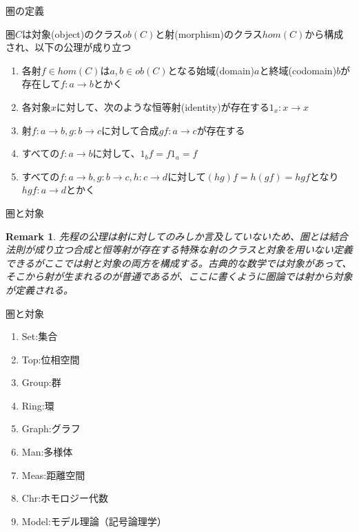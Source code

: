 \documentclass[unicode,12pt,aspectratio=169]{beamer}
\newtheorem*{remark}{Remark}
\begin{document}
\begin{frame}{圏の定義}
    \begin{tcolorbox}
        \begin{definition}
            圏$C$は対象(object)のクラス$ob(C)$と射(morphism)のクラス$hom(C)$から構成され、以下の公理が成り立つ
            \begin{enumerate}
                \item 各射$f\in hom(C)$は$a,b\in ob(C)$となる始域(domain)$a$と終域(codomain)$b$が存在して$f:a \rightarrow b$とかく
                \item 各対象$x$に対して、次のような恒等射(identity)が存在する$1_x:x \rightarrow x$
                \item 射$f: a \rightarrow b,g: b \rightarrow c$に対して合成$gf: a \rightarrow c$が存在する
                \item すべての$f:a \rightarrow b$に対して、$1_bf = f1_a = f$
                \item すべての$f:a \rightarrow b,g:b \rightarrow c,h:c \rightarrow d$に対して$(hg)f = h(gf) = hgf$となり$hgf: a\rightarrow d$とかく
            \end{enumerate}
        \end{definition}
    \end{tcolorbox}
\end{frame}
\begin{frame}{圏と対象}
    \begin{tcolorbox}
        \begin{remark}
            先程の公理は射に対してのみしか言及していないため、圏とは結合法則が成り立つ合成と恒等射が存在する特殊な射のクラスと対象を用いない定義できるがここでは射と対象の両方を構成する。古典的な数学では対象があって、そこから射が生まれるのが普通であるが、ここに書くように圏論では射から対象が定義される。
        \end{remark}
    \end{tcolorbox}
\end{frame}
\begin{frame}{圏と対象}
    \begin{tcolorbox}
        \begin{example}
            \begin{enumerate}
                \item Set:集合
                \item Top:位相空間
                \item Group:群
                \item Ring:環
                \item Graph:グラフ
                \item Man:多様体
                \item Meas:距離空間
                \item Chr:ホモロジー代数
                \item Model:モデル理論（記号論理学）
            \end{enumerate}
        \end{example}
    \end{tcolorbox}
\end{frame}
\end{document}
